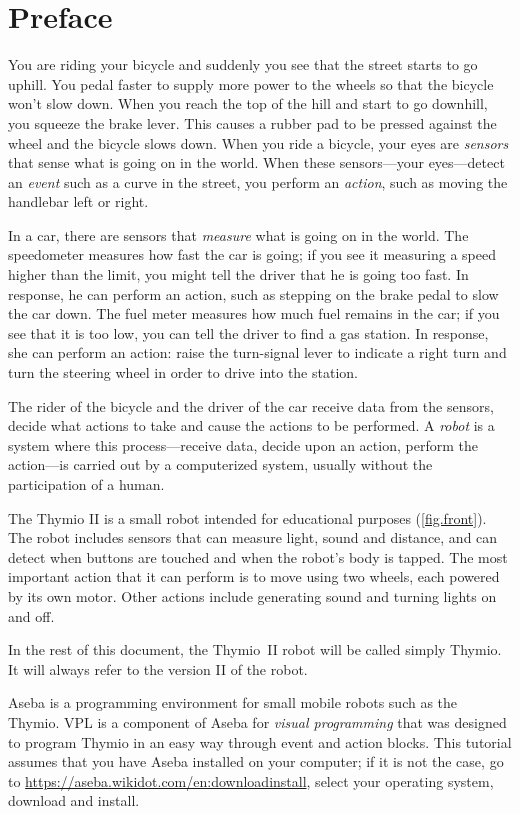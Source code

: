 
\chapter*{Preface}


You are riding your bicycle and suddenly you see that the street starts
to go uphill. You pedal faster to supply more power to the wheels so
that the bicycle won't slow down. When you reach the top of the hill and
start to go downhill, you squeeze the brake lever. This causes a rubber
pad to be pressed against the wheel and the bicycle slows down.
When you ride a bicycle, your eyes are \textit{sensors} that sense what is
going on in the world. When these sensors---your eyes---detect an
\textit{event} such as a curve in the street, you perform an
\textit{action}, such as moving the handlebar left or right.

In a car, there are sensors that \textit{measure} what is going on in the
world. The speedometer measures how fast the car is going; if you see it
measuring a speed higher than the limit, you might tell the driver that
he is going too fast. In response, he can perform an action, such as
stepping on the brake pedal to slow the car down. The fuel meter
measures how much fuel remains in the car; if you see that it is too
low, you can tell the driver to find a gas station. In response, she can
perform an action: raise the turn-signal lever to indicate a right turn
and turn the steering wheel in order to drive into the station.

The rider of the bicycle and the driver of the car receive data from
the sensors, decide what actions to take and cause the actions to be
performed. A \textit{robot} is a system where this process---receive data,
decide upon an action, perform the action---is carried out by a
computerized system, usually without the participation of a human.


The Thymio II is a small robot intended for educational purposes
(\cref{fig.front}). The robot includes sensors that can measure
light, sound and distance, and can detect when buttons are touched and
when the robot's body is tapped. The most important action that it can
perform is to move using two wheels, each powered by its own motor.
Other actions include generating sound and turning lights on and off.

In the rest of this document, the Thymio~II robot will be called simply Thymio.
It will always refer to the version II of the robot.

Aseba is a programming environment for small mobile robots such as the Thymio.
VPL is a component of Aseba for \textit{visual programming} that was designed to program Thymio in an easy way through event and action blocks.
This tutorial assumes that you have Aseba installed on your computer; if it is not the case, go to \url{https://aseba.wikidot.com/en:downloadinstall}, select your operating system, download and install.


